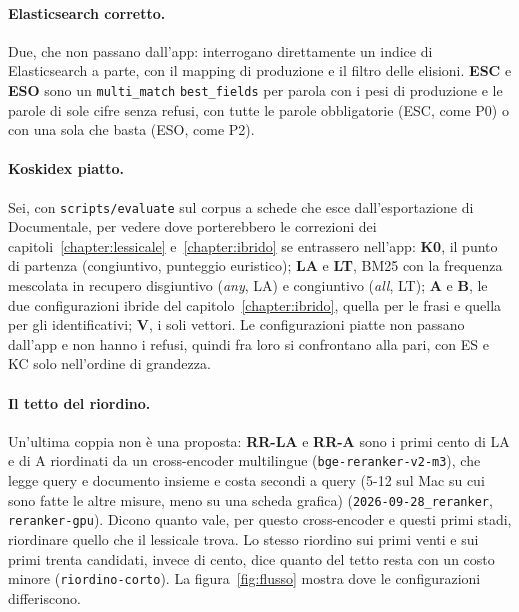 \paragraph{Elasticsearch corretto.} Due, che non passano dall'app: interrogano
direttamente un indice di Elasticsearch a parte, con il mapping di produzione e
il filtro delle elisioni. \textbf{ESC} e \textbf{ESO} sono un
\texttt{multi\_match} \texttt{best\_fields} per parola con i pesi di produzione e
le parole di sole cifre senza refusi, con tutte le parole obbligatorie (ESC,
come P0) o con una sola che basta (ESO, come P2).

\paragraph{Koskidex piatto.} Sei, con \texttt{scripts/evaluate} sul corpus a
schede che esce dall'esportazione di Documentale, per vedere dove porterebbero
le correzioni dei capitoli~\ref{chapter:lessicale} e~\ref{chapter:ibrido} se
entrassero nell'app: \textbf{K0}, il punto di partenza (congiuntivo,
punteggio euristico); \textbf{LA} e \textbf{LT}, BM25 con la frequenza
mescolata in recupero disgiuntivo (\emph{any}, LA) e
congiuntivo (\emph{all}, LT); \textbf{A} e \textbf{B},
le due configurazioni ibride del capitolo~\ref{chapter:ibrido}, quella per le
frasi e quella per gli identificativi; \textbf{V}, i soli vettori. Le
configurazioni piatte non passano dall'app e non hanno i refusi, quindi fra
loro si confrontano alla pari, con ES e KC solo nell'ordine di grandezza.

\paragraph{Il tetto del riordino.} Un'ultima coppia non è una proposta:
\textbf{RR-LA} e \textbf{RR-A} sono i primi cento di LA e di A riordinati da un
cross-encoder multilingue (\texttt{bge-reranker-v2-m3}), che legge query e
documento insieme e costa secondi a query (5-12 sul Mac su cui sono fatte le
altre misure, meno su una scheda grafica) (\texttt{2026-09-28\_reranker}, \texttt{reranker-gpu}). Dicono quanto vale, per questo cross-encoder e questi primi stadi, riordinare
quello che il lessicale trova. Lo stesso riordino sui primi venti e sui primi
trenta candidati, invece di cento, dice quanto del tetto resta con un costo
minore (\texttt{riordino-corto}). La figura~\ref{fig:flusso} mostra dove le
configurazioni differiscono.



